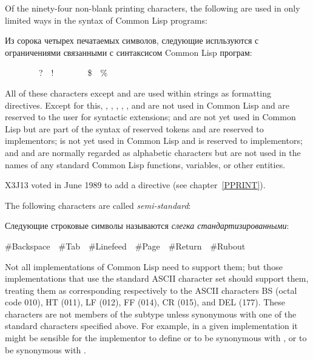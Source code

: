 Of the ninety-four non-blank printing characters, the following are
used in only limited ways in the syntax of Common Lisp programs:

Из сорока четырех печатаемых символов, следующие испльзуются с ограничениями
связанными с синтаксисом Common Lisp програм:
\begin{lisp}
{\Xlbracket}~~{\Xrbracket}~~{\Xlbrace}~~{\Xrbrace}~~?~~!~~{\Xcircumflex}~~{\Xunderscore}~~{\Xtilde}~~\$~~\% 
\end{lisp}

\begin{obsolete}
\noindent
All of these characters except \cd{!} and \cd{{\Xunderscore}} are used within
 strings as formatting directives.
Except for this,
\cd{{\Xlbracket}}, \cd{{\Xrbracket}}, \cd{{\Xlbrace}}, \cd{{\Xrbrace}},
, and \cd{!} are not used in Common Lisp and are reserved to the user
for syntactic extensions; \cd{{\Xcircumflex}} and \cd{{\Xunderscore}}
are not yet used in Common Lisp
but are part of the syntax of reserved tokens
and are reserved to implementors;
\cd{{\Xtilde}} is not yet used in Common Lisp and is reserved to implementors;
and \cd{\$} and \cd{\%} are normally regarded as alphabetic characters
but are not used in the names of any standard Common Lisp functions,
variables, or other entities.
\end{obsolete}

\begin{newer}
X3J13 voted in June 1989 
to add a  directive \cd{{\Xtilde}{\Xunderscore}} (see chapter~\ref{PPRINT}).
\end{newer}

The following characters are called {\it semi-standard}:

Следующие строковые символы называются {\it слегка стандартизированными}:
\begin{lisp}
\#{\Xbackslash}Backspace~~\#{\Xbackslash}Tab~~\#{\Xbackslash}Linefeed~~\#{\Xbackslash}Page~~\#{\Xbackslash}Return~~\#{\Xbackslash}Rubout
\end{lisp}
Not all implementations of Common Lisp need to support them; but those
implementations that
use the standard ASCII character set should support them, treating them as
corresponding respectively to the ASCII characters BS (octal code 010),
HT (011), LF (012), FF (014), CR (015), and DEL
(177). These characters are not
members of the subtype  unless synonymous with
one of the standard characters specified above.
For example, in a given implementation it might
be sensible for the implementor to define
 or  to be synonymous with ,
or  to be synonymous with .

